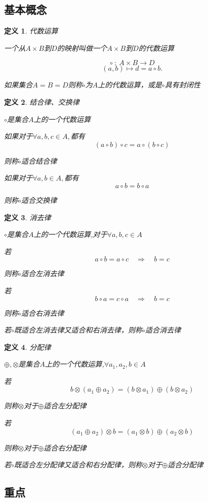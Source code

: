 \documentclass[hyperref,UTF8]{ctexart}
\newtheorem{definition}{定义}[subsection]
\begin{document}
	\subsection{基本概念}
	\begin{definition}
	代数运算
	
	一个从$A\times B$到$D$的映射叫做一个$A\times B$到$D$的代数运算
	
	\[\circ {\ :\ }A\times B \to D \]
	\[(a,b) \mapsto d = a\circ b. \]
	
	如果集合$A=B=D$则称$\circ$为$A$上的代数运算，或是$\circ$具有封闭性
	\end{definition}	
	\begin{definition}结合律、交换律
		
		$\circ$是集合$A$上的一个代数运算
		
		\item[(1)] 如果对于$\forall a,b,c\in A ,$都有\[(a\circ b)\circ c = a \circ (b\circ c)\]
		
		则称$\circ$适合结合律
		\item[(2)] 如果对于$\forall a,b\in A ,$都有\[a\circ b = b\circ a\]
		
		则称$\circ$适合交换律
	\end{definition}
	\begin{definition}
		消去律
		
		$\circ$是集合$A$上的一个代数运算,对于$\forall a,b,c\in A$
		
		\item[(1)] 若\[a\circ b = a \circ c \quad \Rightarrow \quad b=c\] 
		
		则称$\circ$适合左消去律
		\item[(2)]若\[b\circ a = c \circ a \quad \Rightarrow \quad b=c\]
		
		则称$\circ$适合右消去律
		\item[(3)]若$\circ$既适合左消去律又适合和右消去律，则称$\circ$适合消去律
	\end{definition}
	\begin{definition}
		分配律
		
		$\oplus,\otimes$是集合$A$上的一个代数运算,$\forall a_1,a_2,b\in A$
		
		\item[(1)] 若\[b\otimes(a_1\oplus a_2)  = (b\otimes a_1) \oplus (b\otimes a_2)\] 
		
		则称$\otimes$对于$ \oplus $适合左分配律
		\item[(2)]若\[(a_1\oplus a_2)\otimes b = (a_1\otimes b) \oplus (a_2\otimes b)\]
		
		则称$\otimes$对于$ \oplus $适合右分配律
		\item[(3)]若$\circ$既适合左分配律又适合和右分配律，则称$\otimes$对于$ \oplus $适合分配律
		
	\end{definition}

	
	
	\subsection{重点}

	
\end{document}
